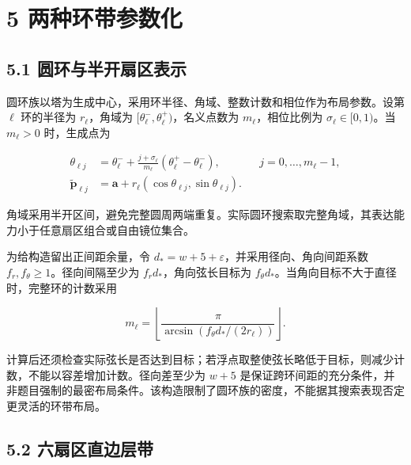 \documentclass[UTF8,fontset=windows,zihao=-4]{ctexart}
\begin{document}
\section*{5 两种环带参数化}

\subsection*{5.1 圆环与半开扇区表示}

\par\noindent\begin{minipage}{\linewidth}
圆环族以塔为生成中心，采用环半径、角域、整数计数和相位作为布局参数。设第 \(\ell\) 环的半径为 \(r_\ell\)，角域为 \([\theta_\ell^-,\theta_\ell^+)\)，名义点数为 \(m_\ell\)，相位比例为 \(\sigma_\ell\in[0,1)\)。当 \(m_\ell>0\) 时，生成点为

\[
\begin{aligned}
\theta_{\ell j}
&=\theta_\ell^-+\frac{j+\sigma_\ell}{m_\ell}
(\theta_\ell^+-\theta_\ell^-),
&&j=0,\ldots,m_\ell-1,\\
\widetilde{\boldsymbol p}_{\ell j}
&=\boldsymbol a+r_\ell(\cos\theta_{\ell j},\sin\theta_{\ell j}).
\end{aligned}
\tag{16}
\]
\end{minipage}\par

角域采用半开区间，避免完整圆周两端重复。实际圆环搜索取完整角域，其表达能力小于任意扇区组合或自由镜位集合。

\par\noindent\begin{minipage}{\linewidth}
为给构造留出正间距余量，令 \(d_* =w+5+\varepsilon\)，并采用径向、角向间距系数 \(f_r,f_\theta\ge1\)。径向间隔至少为 \(f_rd_*\)，角向弦长目标为 \(f_\theta d_*\)。当角向目标不大于直径时，完整环的计数采用

\[
m_\ell=
\left\lfloor
\frac{\pi}{\arcsin\!\left(f_\theta d_*/(2r_\ell)\right)}
\right\rfloor.
\tag{17}
\]
\end{minipage}\par

计算后还须检查实际弦长是否达到目标；若浮点取整使弦长略低于目标，则减少计数，不能以容差增加计数。径向差至少为 \(w+5\) 是保证跨环间距的充分条件，并非题目强制的最密布局条件。该构造限制了圆环族的密度，不能据其搜索表现否定更灵活的环带布局。

\subsection*{5.2 六扇区直边层带}
\end{document}
